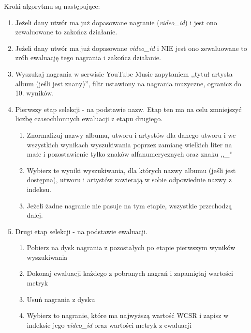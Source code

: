 Kroki algorytmu są następujące:
\begin{enumerate}
    \item Jeżeli dany utwór ma już dopasowane nagranie (\emph{video\_id}) i jest ono zewaluowane to
        zakończ działanie.
    \item Jeżeli dany utwór ma już dopasowane \emph{video\_id} i NIE jest ono zewaluowane to zrób
        ewaluację tego nagrania i zakończ działanie.
    \item Wyszukaj nagrania w serwisie YouTube Music zapytaniem ,,tytuł artysta album (jeśli jest
        znany)'', filtr ustawiony na nagrania muzyczne, ogranicz do 10. wyników.
    \item Pierwszy etap selekcji - na podstawie nazw. Etap ten ma na celu zmniejszyć liczbę
        czasochłonnych ewaluacji z etapu drugiego. 
        \begin{enumerate}
            \item Znormalizuj nazwy albumu, utworu i artystów dla danego utworu i we wszystkich
                wynikach wyszukiwania poprzez zamianę wielkich liter na małe i pozostawienie tylko
                znaków alfanumerycznych oraz znaku ,,\_''
            \item Wybierz te wyniki wyszukiwania, dla których nazwy albumu (jeśli jest
                dostępna), utworu i artystów zawierają w sobie odpowiednie nazwy z indeksu.
            \item Jeżeli żadne nagranie nie pasuje na tym etapie, wszystkie przechodzą dalej.
        \end{enumerate}
    \item Drugi etap selekcji - na podstawie ewaluacji.
        \begin{enumerate}
            \item Pobierz na dysk nagrania z pozostałych po etapie pierwszym wyników wyszukiwania
            \item Dokonaj ewaluacji każdego z pobranych nagrań i zapamiętaj wartości metryk
            \item Usuń nagrania z dysku
            \item Wybierz to nagranie, które ma najwyższą wartość WCSR i zapisz w indeksie jego
                \emph{video\_id} oraz wartości metryk z ewaluacji
        \end{enumerate}
\end{enumerate}

